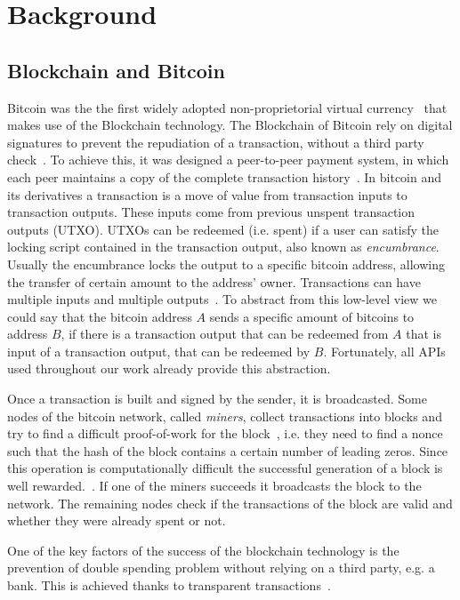 \section{Background} \label{background}
\subsection{Blockchain and Bitcoin}
Bitcoin was the the first widely adopted non-proprietorial virtual
currency~\cite{bib:respCrypto} that makes use of the
Blockchain technology. The Blockchain of Bitcoin rely on digital
signatures to prevent the repudiation of a transaction, without a third
party check~\cite{bib:anonAnalysis}.
To achieve this, it was designed a peer-to-peer payment system,
in which each peer maintains a copy of the complete transaction
history~\cite{bib:fistful}. 
In bitcoin and its derivatives a transaction is a move of value 
from transaction inputs to transaction outputs.
These inputs come from previous unspent transaction outputs (UTXO).
UTXOs can be redeemed (i.e. spent) if a user can satisfy the locking
script contained in the transaction output, also known as \emph{encumbrance}.
Usually the encumbrance locks the output to a specific bitcoin address,
allowing the transfer of certain amount to the address' owner.
Transactions can have multiple inputs and multiple 
outputs~\cite{bib:bitcoin:mastering}. 
To abstract from this low-level view we could say that the bitcoin
address $A$ sends a specific amount of bitcoins to address $B$, 
if there is a transaction output that can be redeemed from $A$ that
is input of a transaction output, that can be redeemed by $B$.
Fortunately, all APIs used throughout our work already provide this
abstraction.

Once a transaction is built and signed by the
sender, it is broadcasted. Some nodes of the bitcoin network, called
\textit{miners}, collect transactions into blocks and try to find a difficult
proof-of-work for the block~\cite{bib:hashcash, bib:pricing}, i.e. they
need to find a nonce such that the hash of the block contains a certain number
of leading zeros. Since this operation is
computationally difficult the successful generation of a block is well
rewarded.~\cite{bib:satoshi}. If one of the miners succeeds it broadcasts the
block to the network. The remaining nodes check if the transactions of the
block are valid and whether they were already spent or not. 

One of the key factors of the success of the blockchain technology
is the prevention of double spending problem without relying on a third party,
e.g. a bank. This is achieved thanks to transparent
transactions~\cite{bib:bitcoinbeyond}.

